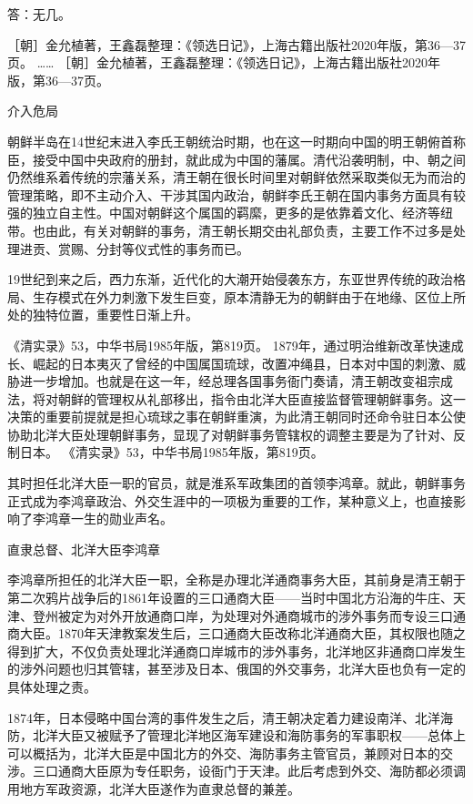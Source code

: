 \documentclass[12pt,UTF8]{ctexbook}
\begin{document}
答：无几。

［朝］金允植著，王鑫磊整理：《领选日记》，上海古籍出版社2020年版，第36—37页。
…… ［朝］金允植著，王鑫磊整理：《领选日记》，上海古籍出版社2020年版，第36—37页。

介入危局

朝鲜半岛在14世纪末进入李氏王朝统治时期，也在这一时期向中国的明王朝俯首称臣，接受中国中央政府的册封，就此成为中国的藩属。清代沿袭明制，中、朝之间仍然维系着传统的宗藩关系，清王朝在很长时间里对朝鲜依然采取类似无为而治的管理策略，即不主动介入、干涉其国内政治，朝鲜李氏王朝在国内事务方面具有较强的独立自主性。中国对朝鲜这个属国的羁縻，更多的是依靠着文化、经济等纽带。也由此，有关对朝鲜的事务，清王朝长期交由礼部负责，主要工作不过多是处理进贡、赏赐、分封等仪式性的事务而已。

19世纪到来之后，西力东渐，近代化的大潮开始侵袭东方，东亚世界传统的政治格局、生存模式在外力刺激下发生巨变，原本清静无为的朝鲜由于在地缘、区位上所处的独特位置，重要性日渐上升。

《清实录》53，中华书局1985年版，第819页。
1879年，通过明治维新改革快速成长、崛起的日本夷灭了曾经的中国属国琉球，改置冲绳县，日本对中国的刺激、威胁进一步增加。也就是在这一年，经总理各国事务衙门奏请，清王朝改变祖宗成法，将对朝鲜的管理权从礼部移出，指令由北洋大臣直接监督管理朝鲜事务。这一决策的重要前提就是担心琉球之事在朝鲜重演，为此清王朝同时还命令驻日本公使协助北洋大臣处理朝鲜事务，显现了对朝鲜事务管辖权的调整主要是为了针对、反制日本。 《清实录》53，中华书局1985年版，第819页。

其时担任北洋大臣一职的官员，就是淮系军政集团的首领李鸿章。就此，朝鲜事务正式成为李鸿章政治、外交生涯中的一项极为重要的工作，某种意义上，也直接影响了李鸿章一生的勋业声名。


直隶总督、北洋大臣李鸿章

李鸿章所担任的北洋大臣一职，全称是办理北洋通商事务大臣，其前身是清王朝于第二次鸦片战争后的1861年设置的三口通商大臣——当时中国北方沿海的牛庄、天津、登州被定为对外开放通商口岸，为处理对外通商城市的涉外事务而专设三口通商大臣。1870年天津教案发生后，三口通商大臣改称北洋通商大臣，其权限也随之得到扩大，不仅负责处理北洋通商口岸城市的涉外事务，北洋地区非通商口岸发生的涉外问题也归其管辖，甚至涉及日本、俄国的外交事务，北洋大臣也负有一定的具体处理之责。

1874年，日本侵略中国台湾的事件发生之后，清王朝决定着力建设南洋、北洋海防，北洋大臣又被赋予了管理北洋地区海军建设和海防事务的军事职权——总体上可以概括为，北洋大臣是中国北方的外交、海防事务主管官员，兼顾对日本的交涉。三口通商大臣原为专任职务，设衙门于天津。此后考虑到外交、海防都必须调用地方军政资源，北洋大臣遂作为直隶总督的兼差。
\end{document}
